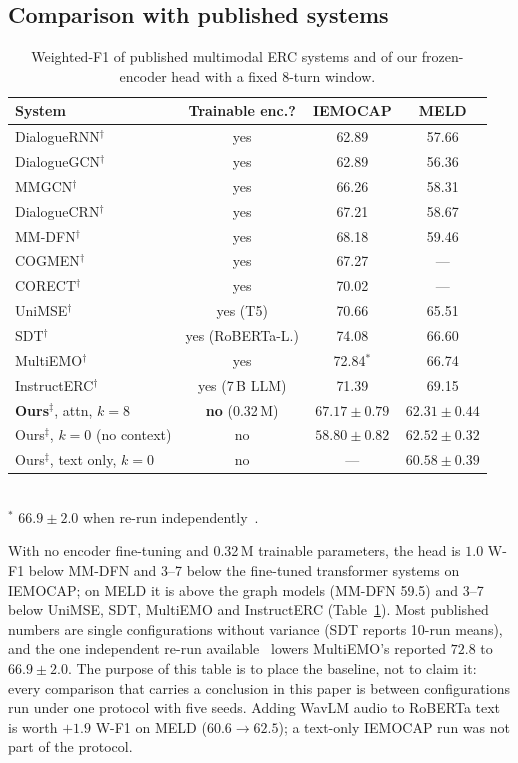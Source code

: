 \documentclass[journal]{IEEEtran}
\newcommand{\wf}{W-F1}
\begin{document}
\subsection{Comparison with published systems}
\begin{table}[t]\centering\footnotesize\setlength{\tabcolsep}{2pt}
\caption{Weighted-F1 of published multimodal ERC systems and of our frozen-encoder head with a fixed 8-turn window.}\label{tab:sota}
\begin{tabular}{lccc}\toprule
System & Trainable enc.? & IEMOCAP & MELD \\ \midrule
DialogueRNN$^\dagger$~\cite{majumder2019dialoguernn} & yes & 62.89 & 57.66 \\
DialogueGCN$^\dagger$~\cite{ghosal2019dialoguegcn} & yes & 62.89 & 56.36 \\
MMGCN$^\dagger$~\cite{hu2021mmgcn} & yes & 66.26 & 58.31 \\
DialogueCRN$^\dagger$~\cite{hu2021dialoguecrn} & yes & 67.21 & 58.67 \\
MM-DFN$^\dagger$~\cite{hu2022mmdfn} & yes & 68.18 & 59.46 \\
COGMEN$^\dagger$~\cite{joshi2022cogmen} & yes & 67.27 & --- \\
CORECT$^\dagger$~\cite{nguyen2023corect} & yes & 70.02 & --- \\
UniMSE$^\dagger$~\cite{hu2022unimse} & yes (T5) & 70.66 & 65.51 \\
SDT$^\dagger$~\cite{ma2024sdt} & yes (RoBERTa-L.) & 74.08 & 66.60 \\
MultiEMO$^\dagger$~\cite{shi2023multiemo} & yes & 72.84$^{\ast}$ & 66.74 \\
InstructERC$^\dagger$~\cite{lei2023instructerc} & yes (7\,B LLM) & 71.39 & 69.15 \\ \midrule
\textbf{Ours}$^\ddagger$, attn, $k=8$ & \textbf{no} (0.32\,M) & $\mathbf{67.17 \pm 0.79}$ & $62.31 \pm 0.44$ \\
Ours$^\ddagger$, $k = 0$ (no context) & no & $58.80 \pm 0.82$ & $62.52 \pm 0.32$ \\
Ours$^\ddagger$, text only, $k = 0$ & no & --- & $60.58 \pm 0.39$ \\ \bottomrule
\end{tabular}\\[2pt]{\scriptsize $^{\ast}$ $66.9 \pm 2.0$ when re-run independently~\cite{dutta2026mister}.}
\end{table}

With no encoder fine-tuning and 0.32\,M trainable parameters, the head is $1.0$ \wf{} below MM-DFN and 3--7 below the fine-tuned transformer systems on IEMOCAP; on MELD it is above the graph models (MM-DFN 59.5) and 3--7 below UniMSE, SDT, MultiEMO and InstructERC (Table~\ref{tab:sota}). Most published numbers are single configurations without variance (SDT reports 10-run means), and the one independent re-run available~\cite{dutta2026mister} lowers MultiEMO's reported $72.8$ to $66.9 \pm 2.0$. The purpose of this table is to place the baseline, not to claim it: every comparison that carries a conclusion in this paper is between configurations run under one protocol with five seeds. Adding WavLM audio to RoBERTa text is worth $+1.9$ \wf{} on MELD ($60.6 \rightarrow 62.5$); a text-only IEMOCAP run was not part of the protocol.
\end{document}
